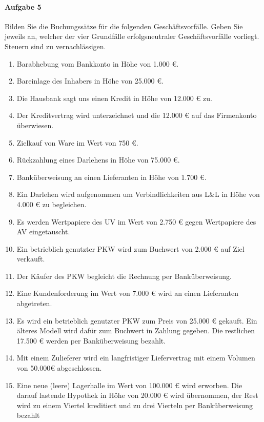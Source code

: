 \documentclass[paper=a4, fontsize=11pt]{scrartcl}
\numberwithin{equation}{section}
\numberwithin{figure}{section}
\numberwithin{table}{section}
\begin{document}
\paragraph{Aufgabe 5}
Bilden Sie die Buchungssätze für die folgenden Geschäftsvorfälle. Geben Sie jeweils an, welcher der vier Grundfälle erfolgsneutraler Geschäftsvorfälle vorliegt. Steuern sind zu vernachlässigen. \\
\begin{enumerate}
\item Barabhebung vom Bankkonto in Höhe von 1.000 €.
\item Bareinlage des Inhabers in Höhe von 25.000 €.
\item Die Hausbank sagt uns einen Kredit in Höhe von 12.000 € zu.
\item Der Kreditvertrag wird unterzeichnet und die 12.000 € auf das Firmenkonto überwiesen.
\item Zielkauf von Ware im Wert von 750 €.
\item Rückzahlung eines Darlehens in Höhe von 75.000 €.
\item Banküberweisung an einen Lieferanten in Höhe von 1.700 €.
\item Ein Darlehen wird aufgenommen um Verbindlichkeiten aus L\&L in Höhe von 4.000 € zu
begleichen.
\item Es werden Wertpapiere des UV im Wert von 2.750 € gegen Wertpapiere des AV eingetauscht.
\item Ein betrieblich genutzter PKW wird zum Buchwert von 2.000 € auf Ziel verkauft.
\item Der Käufer des PKW begleicht die Rechnung per Banküberweisung.
\item Eine Kundenforderung im Wert von 7.000 € wird an einen Lieferanten abgetreten.
\item Es wird ein betrieblich genutzter PKW zum Preis von 25.000 € gekauft. Ein älteres Modell wird dafür zum Buchwert in Zahlung gegeben. Die restlichen 17.500 € werden per
Banküberweisung bezahlt.
\item Mit einem Zulieferer wird ein langfristiger Liefervertrag mit einem Volumen von 50.000€ abgeschlossen.
\item Eine neue (leere) Lagerhalle im Wert von 100.000 € wird erworben. Die darauf lastende Hypothek in Höhe von 20.000 € wird übernommen, der Rest wird zu einem Viertel kreditiert und zu drei Vierteln per Banküberweisung bezahlt
\end{enumerate}
\end{document}
